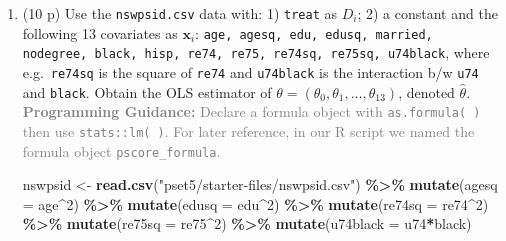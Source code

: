 \documentclass[
]{article}
\newenvironment{Shaded}{\begin{snugshade}}{\end{snugshade}}
\newcommand{\AttributeTok}[1]{\textcolor[rgb]{0.13,0.29,0.53}{#1}}
\newcommand{\DecValTok}[1]{\textcolor[rgb]{0.00,0.00,0.81}{#1}}
\newcommand{\FunctionTok}[1]{\textcolor[rgb]{0.13,0.29,0.53}{\textbf{#1}}}
\newcommand{\NormalTok}[1]{#1}
\newcommand{\OtherTok}[1]{\textcolor[rgb]{0.56,0.35,0.01}{#1}}
\newcommand{\SpecialCharTok}[1]{\textcolor[rgb]{0.81,0.36,0.00}{\textbf{#1}}}
\newcommand{\StringTok}[1]{\textcolor[rgb]{0.31,0.60,0.02}{#1}}
\begin{document}
\begin{enumerate}
  \begin{enumerate}
  \def\labelenumii{\alph{enumii}.}
  \item
    (10 p) Use the \texttt{nswpsid.csv} data with: 1) \texttt{treat} as
    \(D_i\); 2) a constant and the following 13 covariates as
    \(\mathbf{x}_{i}\):
    \texttt{age, agesq, edu, edusq, married, nodegree, black, hisp, re74, re75, re74sq, re75sq, u74black},
    where e.g.~\texttt{re74sq} is the square of \texttt{re74} and
    \texttt{u74black} is the interaction b/w \texttt{u74} and
    \texttt{black}. Obtain the OLS estimator of
    \(\theta=(\theta_0,\theta_1,\ldots,\theta_{13})\), denoted
    \(\hat{\theta}\).
    \textcolor{gray}{\textbf{Programming Guidance:} Declare a formula object with \texttt{as.formula( )} then use \texttt{stats::lm( )}. For later reference, in our R script we named the formula object \texttt{pscore\_formula}.}
    \label{item:lpm:ols:reg}

\begin{Shaded}
\begin{Highlighting}[]
\NormalTok{nswpsid }\OtherTok{\textless{}{-}} \FunctionTok{read.csv}\NormalTok{(}\StringTok{"pset5/starter{-}files/nswpsid.csv"}\NormalTok{) }\SpecialCharTok{\%\textgreater{}\%}
  \FunctionTok{mutate}\NormalTok{(}\AttributeTok{agesq =}\NormalTok{ age}\SpecialCharTok{\^{}}\DecValTok{2}\NormalTok{) }\SpecialCharTok{\%\textgreater{}\%} \FunctionTok{mutate}\NormalTok{(}\AttributeTok{edusq =}\NormalTok{ edu}\SpecialCharTok{\^{}}\DecValTok{2}\NormalTok{) }\SpecialCharTok{\%\textgreater{}\%}
  \FunctionTok{mutate}\NormalTok{(}\AttributeTok{re74sq =}\NormalTok{ re74}\SpecialCharTok{\^{}}\DecValTok{2}\NormalTok{) }\SpecialCharTok{\%\textgreater{}\%} \FunctionTok{mutate}\NormalTok{(}\AttributeTok{re75sq =}\NormalTok{ re75}\SpecialCharTok{\^{}}\DecValTok{2}\NormalTok{) }\SpecialCharTok{\%\textgreater{}\%}
  \FunctionTok{mutate}\NormalTok{(}\AttributeTok{u74black =}\NormalTok{ u74}\SpecialCharTok{*}\NormalTok{black)}
\end{Highlighting}
\end{Shaded}


\end{enumerate}
\end{enumerate}
\end{document}
